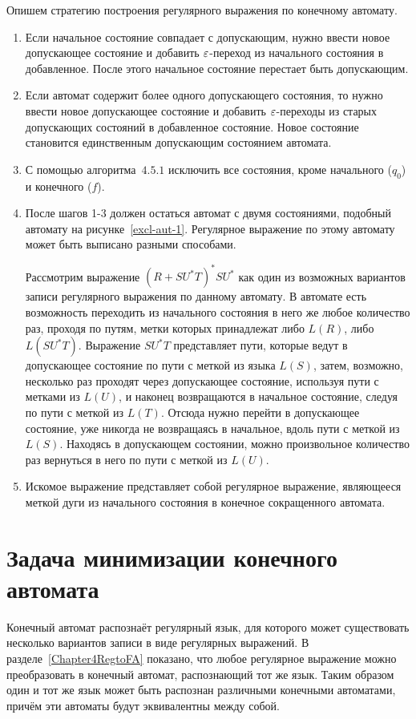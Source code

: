 Опишем стратегию построения регулярного выражения по конечному автомату.
\begin{enumerate}
	\item Если начальное состояние совпадает с допускающим, нужно ввести новое допускающее состояние и добавить $\varepsilon$-переход из начального состояния в добавленное. После этого начальное состояние перестает быть допускающим.
	\item Если автомат содержит более одного допускающего состояния, то нужно ввести новое допускающее состояние и добавить $\varepsilon$-переходы из старых допускающих состояний в добавленное состояние. Новое состояние становится единственным допускающим состоянием автомата.
	\item С помощью алгоритма~$4.5.1$ исключить все состояния, кроме начального ($q_0$) и конечного ($f$).
	\item После шагов 1-3 должен остаться автомат с двумя состояниями, подобный автомату на рисунке~\ref{excl-aut-1}. Регулярное выражение по этому автомату может быть выписано разными способами.

Рассмотрим выражение $(R + SU^*T)^*SU^*$ как один из возможных вариантов записи регулярного выражения по данному автомату. В автомате есть возможность переходить из начального состояния в него же любое количество раз, проходя по путям, метки которых принадлежат либо $L(R)$, либо $L(SU^*T)$. Выражение $SU^*T$ представляет пути, которые ведут в допускающее состояние по пути с меткой из языка $L(S)$, затем, возможно, несколько раз проходят через допускающее состояние, используя пути с метками из $L(U)$, и наконец возвращаются в начальное состояние, следуя по пути с меткой из $L(T)$. Отсюда нужно перейти в допускающее состояние, уже никогда не возвращаясь в начальное, вдоль пути с меткой из $L(S)$. Находясь в допускающем состоянии, можно произвольное количество раз вернуться в него по пути с меткой из $L(U)$.

\item Искомое выражение представляет собой регулярное выражение, являющееся меткой дуги из начального состояния в конечное сокращенного автомата.
\end{enumerate}

\section{Задача минимизации конечного автомата}
\label{Chapter4FALMin}

Конечный автомат распознаёт регулярный язык, для которого может существовать несколько вариантов записи в виде регулярных выражений. В разделе~\ref{Chapter4RegtoFA} показано, что любое регулярное выражение можно преобразовать в конечный автомат, распознающий тот же язык. Таким образом один и тот же язык может быть распознан различными конечными автоматами, причём эти автоматы будут эквивалентны между собой.

